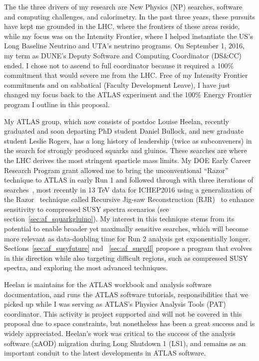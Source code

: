 
The the three drivers of my research are New Physics (NP) searches,
software and computing challenges, and calorimetry. In the past three
years, these pursuits have kept me grounded in the LHC, where the
frontiers of these areas reside, while my focus was on the Intensity
Frontier, where I helped instantiate the US's Long Baseline
Neutrino and UTA's neutrino programs. On September 1, 2016, my term as
DUNE's Deputy Software and Computing Coordinator (DS\&CC) ended. I
chose not to ascend to full coordinator because it required a 100\%
commitment that would severe me from the LHC. Free of my Intensity
Frontier commitments and on sabbatical (Faculty Development Leave), I
have just changed my focus back to the ATLAS experiment and the 100\%
Energy Frontier program I outline in this proposal.

My ATLAS group, which now consists of postdoc Louise Heelan, recently
graduated and soon departing PhD student Daniel Bullock, and new
graduate student Leslie Rogers, has a long history of leadership
(twice as subconveners) in the search for strongly produced squarks
and gluinos. These searches are where the LHC derives the most
stringent sparticle mass limits. My DOE Early Career Research Program
grant allowed me to bring the unconventional ``Razor'' technique to
ATLAS in early Run 1 and followed through with three iterations of
searches~\cite{Aad:2012naa,Aad:2015iea,ATLAS-CONF-2016-078}, most
recently in 13 TeV data for ICHEP2016 using a generalization of the
Razor~\cite{Rogan:2010kb} technique called Recursive Jig-saw
Reconstruction (RJR)~\cite{Jackson:2016mfb} to enhance sensitivity to
compressed SUSY spectra scenarios (see
section~\ref{sec:af_squarkgluino}). My interest in this technique
stems from its potential to enable broader yet maximally sensitive
searches, which will become more relevant as data-doubling time for
Run 2 analysis get exponentially longer.
Sections~\ref{sec:af_susyfuture} and ~\ref{sec:af_susydl} propose a
program that evolves in this direction while also targeting difficult
regions, such as compressed SUSY spectra, and exploring the most
advanced techniques.

Heelan is maintains for the ATLAS workbook and analysis software
documentation, and runs the ATLAS software tutorials, responsibilities
that we picked up while I was serving as ATLAS's Physics Analysis
Tools (PAT) coordinator. This activity is project supported and will
not be covered in this proposal due to space constraints, but
nonetheless has been a great success and is widely
appreciated. Heelan's work was critical to the success of the analysis
software (xAOD) migration during Long Shutdown 1 (LS1), and remains as
an important conduit to the latest developments in ATLAS software.

